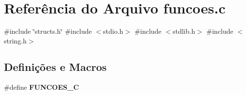\section{Referência do Arquivo funcoes.\+c}
\label{funcoes_8c}
{\ttfamily \#include \char`\"{}structs.\+h\char`\"{}}\newline
{\ttfamily \#include $<$stdio.\+h$>$}\newline
{\ttfamily \#include $<$stdlib.\+h$>$}\newline
{\ttfamily \#include $<$string.\+h$>$}\newline
\subsection*{Definições e Macros}
\begin{DoxyCompactItemize}
\item 
\#define \textbf{ F\+U\+N\+C\+O\+E\+S\+\_\+C}
\end{DoxyCompactItemize}
